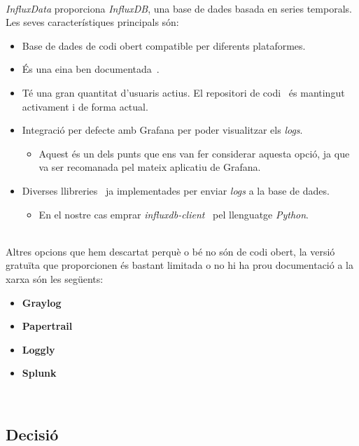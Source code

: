 \noindent \\
\textit{InfluxData} proporciona \textit{InfluxDB}, una base de dades basada en series temporals.
Les seves característiques principals són:

\begin{itemize}
    \item Base de dades de codi obert compatible per diferents plataformes.
    \item És una eina ben documentada~\cite{influxdb:documentation}.
    \item Té una gran quantitat d’usuaris actius.
    El repositori de codi~\cite{influxdb:code} és mantingut activament i de forma actual.
    \item Integració per defecte amb Grafana per poder visualitzar els \textit{logs}.
    \begin{itemize}
        \item Aquest és un dels punts que ens van fer considerar aquesta opció, ja que va ser recomanada pel mateix aplicatiu de Grafana.
    \end{itemize}
    \item Diverses llibreries~\cite{influxdb:libraries} ja implementades per enviar \textit{\gls{log}s} a la base de dades.
    \begin{itemize}
        \item En el nostre cas emprar \textit{influxdb-client}~\cite{influxdb:python} pel llenguatge \textit{Python}.
    \end{itemize}
\end{itemize}

\noindent \\
Altres opcions que hem descartat perquè o bé no són de codi obert, la versió gratuïta que proporcionen és bastant limitada o no hi ha prou documentació a la xarxa són les següents:

\begin{itemize}
    \item \textbf{Graylog}~\cite{graylog}
    \item \textbf{Papertrail}~\cite{papertrail}
    \item \textbf{Loggly}~\cite{loggly}
    \item \textbf{Splunk}~\cite{splunk}
\end{itemize}

\clearpage

\noindent \\
\subsection{Decisió}\label{subsec:log-db-decision}

